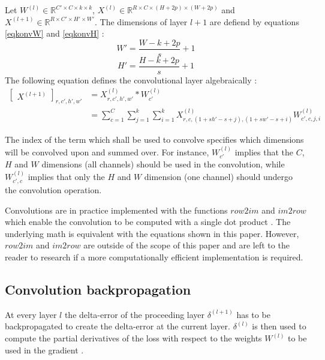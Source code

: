 \documentclass[a4paper, twoside]{article}
\begin{document}
Let $W^{(l)} \in \mathbb{R}^{C' \times C  \times k \times k}$, $X^{(l)} \in \mathbb{R}^{R \times C  \times (H+2p) \times (W+2p)}$ and $X^{(l+1)} \in \mathbb{R}^{R \times C'  \times H' \times W'}$. The dimensions of layer $l+1$ are defiend by equations \eqref{eqkonvW} and \eqref{eqkonvH} \cite{cs231n} \cite{convmath} \cite{convarithmetic}: 
\begin{equation}\label{eqkonvW}
W' = \frac{W-k+2p}{s} +1
\end{equation}
\begin{equation}\label{eqkonvH}
H' = \frac{H-k+2p}{s} +1
\end{equation}
The following equation defines the convolutional layer algebraically \cite{cs231n} \cite{convmath}:
\begin{equation}\label{konvolution}
\begin{split}
	\begin{bmatrix} X^{(l+1)} \end{bmatrix}_{r, c', h', w'}	
		& = X^{(l)}_{r, c', h', w'} *W^{(l)}_{c'} \\
		& = \sum^{C}_{c=1} \sum^{k}_{j=1} \sum^{k}_{i=1} X^{(l)}_{r, c, (1+sh'-s+j), (1+sw'-s+i)}W^{(l)}_{c', c, j, i}
\end{split}
\end{equation}

The index of the term which shall be used to convolve specifies which dimensions will be convolved upon and summed over. For instance, $W^{(l)}_{c'}$ implies that the $C$, $H$ and $W$ dimensions (all channels) should be used in the convolution, while $W^{(l)}_{c', c}$ implies that only the $H$ and $W$ dimension (one channel) should undergo the convolution operation.

Convolutions are in practice implemented with the functions $row2im$ and $im2row$ which enable the convolution to be computed with a single dot product \cite{cs231n} \cite{convmath} \cite{convarithmetic}. The underlying math is equivalent with the equations shown in this paper. However, $row2im$ and $im2row$ are outside of the scope of this paper and are left to the reader to research if a more computationally efficient implementation is required. 

\subsection{Convolution backpropagation}
At every layer $l$ the delta-error of the proceeding layer $\delta^{(l+1)}$ has to be backpropagated to create the delta-error at the current layer. $\delta^{(l)}$ is then used to compute the partial derivatives of the loss with respect to the weights $W^{(l)}$ to be used in the gradient \cite{cs231n} \cite{convmath}. 
 
\end{document}
